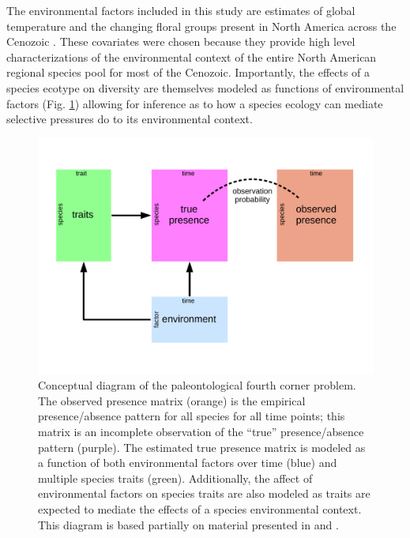 \documentclass[12pt,letterpaper]{article}
\begin{document}
The environmental factors included in this study are estimates of global temperature and the changing floral groups present in North America across the Cenozoic \citep{Cramer2011,Graham2011a}. These covariates were chosen because they provide high level characterizations of the environmental context of the entire North American regional species pool for most of the Cenozoic. Importantly, the effects of a species ecotype on diversity are themselves modeled as functions of environmental factors (Fig. \ref{fig:concept_fourth_corner}) allowing for inference as to how a species ecology can mediate selective pressures do to its environmental context. 

\begin{figure}[ht]
  \centering
  \includegraphics[width=\textwidth,height=0.5\textheight,keepaspectratio=true]{figure/paleo_fourth_corner}
  \caption[Conceptual diagram of the paleontological fourth-courner problem]{Conceptual diagram of the paleontological fourth corner problem. The observed presence matrix (orange) is the empirical presence/absence pattern for all species for all time points; this matrix is an incomplete observation of the ``true'' presence/absence pattern (purple). The estimated true presence matrix is modeled as a function of both environmental factors over time (blue) and multiple species traits (green). Additionally, the affect of environmental factors on species traits are also modeled as traits are expected to mediate the effects of a species environmental context. This diagram is based partially on material presented in \citet{Brown2014c} and \citet{Warton2015a}.}
  \label{fig:concept_fourth_corner}
\end{figure}
\end{document}
